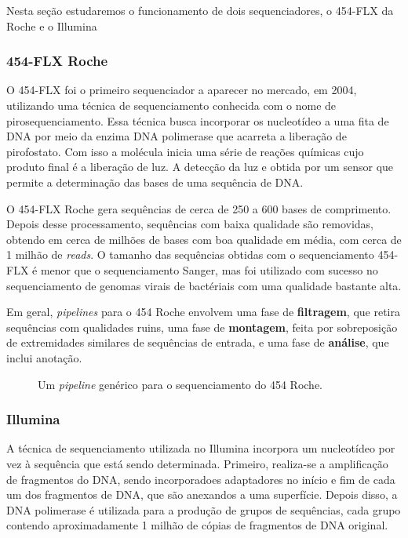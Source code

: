 Nesta seção estudaremos o funcionamento de dois sequenciadores, o 454-FLX da Roche e o Illumina

\subsubsection*{454-FLX Roche} \label{sec:454}

O 454-FLX foi o primeiro sequenciador a aparecer no mercado, em 2004, utilizando uma técnica de sequenciamento conhecida com o nome de pirosequenciamento\citep{ronaghi1998sequencing:1998}. Essa técnica busca incorporar os nucleotídeo a uma fita de DNA por meio da enzima DNA polimerase que acarreta a liberação de pirofostato. Com isso a molécula inicia uma série de reações químicas cujo produto final é a liberação de luz. A detecção da luz e obtida por um sensor que permite a determinação das bases de uma sequência de DNA.


O 454-FLX Roche gera sequências de cerca de 250 a 600 bases de comprimento. Depois desse processamento, sequências com baixa qualidade são removidas, obtendo em cerca de milhões de bases com boa qualidade em média, com cerca de 1 milhão de \textit{reads}. O tamanho das sequências obtidas com o sequenciamento 454-FLX é menor que o sequenciamento Sanger, mas foi utilizado com sucesso no sequenciamento de genomas virais de bactériais com uma qualidade bastante alta.

Em geral, \textit{pipelines} para o 454 Roche envolvem uma fase de \textbf{filtragem}, que retira sequências com qualidades ruins, uma fase de \textbf{montagem}, feita por sobreposição de extremidades similares de sequências de entrada, e uma fase de \textbf{análise}, que inclui anotação.

\begin{figure} [htb!]
\centering
{}
\caption{Um \textit{pipeline} genérico para o sequenciamento do 454 Roche. \label{fig:pipeline-454-FLX}}
\end{figure}


\subsubsection*{Illumina} \label{sec:Illumina}

A técnica de sequenciamento utilizada no Illumina incorpora um nucleotídeo por vez à sequência que está sendo determinada. Primeiro, realiza-se a amplificação de fragmentos do DNA, sendo incorporadoes adaptadores no início e fim de cada um dos fragmentos de DNA, que são anexandos a uma superfície. Depois disso, a DNA polimerase é utilizada para a produção de grupos de sequências, cada grupo contendo aproximadamente 1 milhão de cópias de fragmentos de DNA original.

